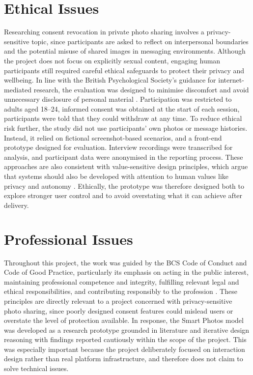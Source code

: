 \section{Ethical Issues}
Researching consent revocation in private photo sharing involves a privacy-sensitive topic, since participants are asked to reflect on interpersonal boundaries and the potential misuse of shared images in messaging environments. Although the project does not focus on explicitly sexual content, engaging human participants still required careful ethical safeguards to protect their privacy and wellbeing. In line with the British Psychological Society's guidance for internet-mediated research, the evaluation was designed to minimise discomfort and avoid unnecessary disclosure of personal material \cite{bps_2021}. Participation was restricted to adults aged 18--24, informed consent was obtained at the start of each session, participants were told that they could withdraw at any time. To reduce ethical risk further, the study did not use participants' own photos or message histories. Instead, it relied on fictional screenshot-based scenarios, and a front-end prototype designed for evaluation. Interview recordings were transcribed for analysis, and participant data were anonymised in the reporting process. These approaches are also consistent with value-sensitive design principles, which argue that systems should also be developed with attention to human values like privacy and autonomy \cite{friedman_hendry_2019}. Ethically, the prototype was therefore designed both to explore stronger user control and to avoid overstating what it can achieve after delivery.

\section{Professional Issues}

Throughout this project, the work was guided by the BCS Code of Conduct and Code of Good Practice, particularly its emphasis on acting in the public interest, maintaining professional competence and integrity, fulfilling relevant legal and ethical responsibilities, and contributing responsibly to the profession \cite{bcs_2022}. These principles are directly relevant to a project concerned with privacy-sensitive photo sharing, since poorly designed consent features could mislead users or overstate the level of protection available. In response, the Smart Photos model was developed as a research prototype grounded in literature and iterative design reasoning with findings reported cautiously within the scope of the project. This was especially important because the project deliberately focused on interaction design rather than real platform infrastructure, and therefore does not claim to solve technical issues.

